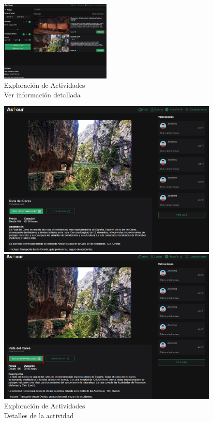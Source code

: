 \begin{figure}[H]
	\centering
	\includegraphics[width=0.5\textwidth]{7-Construccion/Manuales/web/ver info.png}
	\caption{Exploración de Actividades \\ Ver información detallada}
	\label{fig:ver-info}
\end{figure}

\begin{figure}[H]
	\centering
	\begin{minipage}{0.45\textwidth}
		\centering
		\includegraphics[width=1\textwidth]{7-Construccion/Manuales/web/detalles actividad.png}
		\caption{Exploración de Actividades \\ Detalles de la actividad}
		\label{fig:detalles-actividad}
	\end{minipage}
	\hfill
	\begin{minipage}{0.45\textwidth}
		\centering
		\includegraphics[width=1\textwidth]{7-Construccion/Manuales/web/ver disponibilidad.png}

\end{minipage}
\end{figure}

